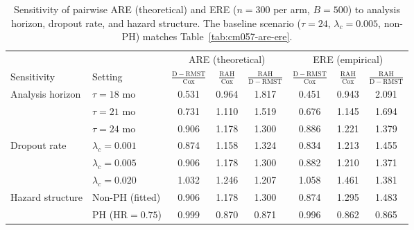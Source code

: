 \begin{table}[ht]
\centering
\caption{Sensitivity of pairwise ARE (theoretical) and ERE ($n=300$ per arm,
  $B=500$) to analysis horizon, dropout rate, and hazard structure.
  The baseline scenario ($\tau=24$, $\lambda_c=0.005$, non-PH) matches
  Table~\ref{tab:cm057-are-ere}.}
\label{tab:sens-are}
\medskip
\begin{tabular}{llcccccc}
\toprule
& & \multicolumn{3}{c}{ARE (theoretical)} & \multicolumn{3}{c}{ERE (empirical)} \\
\cmidrule(lr){3-5}\cmidrule(lr){6-8}
Sensitivity & Setting & $\frac{\mathrm{D-RMST}}{\mathrm{Cox}}$ & $\frac{\mathrm{RAH}}{\mathrm{Cox}}$ & $\frac{\mathrm{RAH}}{\mathrm{D-RMST}}$ & $\frac{\mathrm{D-RMST}}{\mathrm{Cox}}$ & $\frac{\mathrm{RAH}}{\mathrm{Cox}}$ & $\frac{\mathrm{RAH}}{\mathrm{D-RMST}}$ \\
\midrule
\multirow{3}{*}{Analysis horizon} & $\tau=18$ mo & 0.531 & 0.964 & 1.817 & 0.451 & 0.943 & 2.091 \\
 & $\tau=21$ mo & 0.731 & 1.110 & 1.519 & 0.676 & 1.145 & 1.694 \\
 & $\tau=24$ mo & 0.906 & 1.178 & 1.300 & 0.886 & 1.221 & 1.379 \\
\midrule
\multirow{3}{*}{Dropout rate} & $\lambda_c=0.001$ & 0.874 & 1.158 & 1.324 & 0.834 & 1.213 & 1.455 \\
 & $\lambda_c=0.005$ & 0.906 & 1.178 & 1.300 & 0.882 & 1.210 & 1.371 \\
 & $\lambda_c=0.020$ & 1.032 & 1.246 & 1.207 & 1.058 & 1.461 & 1.381 \\
\midrule
\multirow{2}{*}{Hazard structure} & Non-PH (fitted) & 0.906 & 1.178 & 1.300 & 0.874 & 1.295 & 1.483 \\
 & PH ($\mathrm{HR}=0.75$) & 0.999 & 0.870 & 0.871 & 0.996 & 0.862 & 0.865 \\
\bottomrule
\end{tabular}
\end{table}

